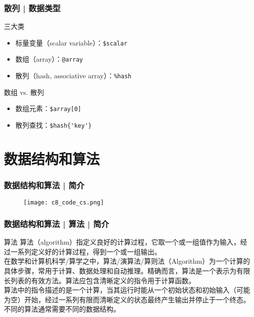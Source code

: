 \begin{frame}[fragile]
  \frametitle{散列 | \alert{数据类型}}
  \begin{block}{三大类}
    \begin{itemize}
      \item 标量变量（scalar variable）：\verb|$scalar|
      \item 数组（array）：\verb|@array|
      \item 散列（hash, associative array）：\verb|%hash|
    \end{itemize}
  \end{block}
  \pause
  \begin{block}{数组 vs. 散列}
    \begin{itemize}
      \item 数组元素：\verb|$array[0]|
      \item 散列查找：\verb|$hash{'key'}|
    \end{itemize}
  \end{block}
\end{frame}

\section{数据结构和算法}
\begin{frame}
  \frametitle{数据结构和算法 | 简介}
  \begin{figure}
    \centering
    \texttt{[image: c8\_code\_cs.png]}
  \end{figure}
\end{frame}

\begin{frame}
  \frametitle{数据结构和算法 | 算法 | 简介}
  \begin{block}{算法}
算法（algorithm）指定义良好的计算过程，它取一个或一组值作为输入，经过一系列定义好的计算过程，得到一个或一组输出。\\
    \vspace{0.5em}
    在数学和计算机科学/算学之中，算法/演算法/算则法（Algorithm）为一个计算的具体步骤，常用于计算、数据处理和自动推理。精确而言，算法是一个表示为有限长列表的有效方法。算法应包含清晰定义的指令用于计算函数。\\
    \vspace{0.5em}
算法中的指令描述的是一个计算，当其运行时能从一个初始状态和初始输入（可能为空）开始，经过一系列有限而清晰定义的状态最终产生输出并停止于一个终态。\\
    \vspace{0.5em}
    \alert{不同的算法通常需要不同的数据结构。}
  \end{block}
\end{frame}

